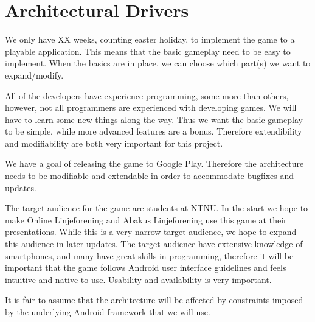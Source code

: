 \section{Architectural Drivers} 
\label{sec:architecturaldrivers}


We only have XX weeks, counting easter holiday, to implement the game to a playable application. This means that the basic gameplay need to be easy to implement. When the basics are in place, we can choose which part(s) we want to expand/modify.

All of the developers have experience programming, some more than others, however, not all programmers are experienced with developing games. We will have to learn some new things along the way. Thus we want the basic gameplay to be simple, while more advanced features are a bonus. Therefore extendibility and modifiability are both very important for this project.

We have a goal of releasing the game to Google Play. Therefore the architecture needs to be modifiable and extendable in order to accommodate bugfixes and updates. 

The target audience for the game are students at NTNU. In the start we hope to make Online Linjeforening and Abakus Linjeforening use this game at their presentations. While this is a very narrow target audience, we hope to expand this audience in later updates. The target audience have extensive knowledge of smartphones, and many have great skills in programming, therefore it will be important that the game follows Android user interface guidelines and feels intuitive and native to use. Usability and availability is very important.

It is fair to assume that the architecture will be affected by constraints imposed by the underlying Android framework that we will use.